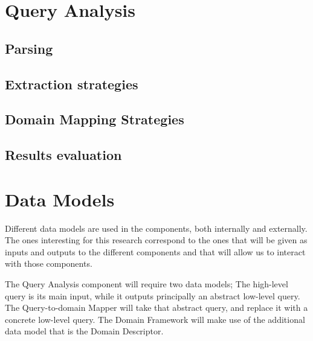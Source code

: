 
\section{Query Analysis} %
\label{sec:query_analysis_spec}

\subsection{Parsing} %
\label{sub:parsing}


\subsection{Extraction strategies} %
\label{sub:extraction_strategies}


\subsection{Domain Mapping Strategies} %
\label{sub:domain_mapping_strategies}


\subsection{Results evaluation} %
\label{sub:results_evaluation}



\section{Data Models} %
\label{sec:data_models}
Different data models are used in the components, both internally and externally. The ones interesting for this research correspond to the ones that will be given as inputs and outputs to the different components and that will allow us to interact with those components.

The Query Analysis component will require two data models; The high-level query is its main input, while it outputs principally an abstract low-level query. The Query-to-domain Mapper will take that abstract query, and replace it with a concrete low-level query. The Domain Framework will make use of the additional data model that is the Domain Descriptor.

